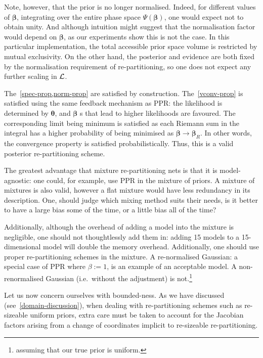 \documentclass[usenatbib]{mnras}
\begin{document}
Note, however, that the prior is no longer normalised. Indeed, for
different values of \(\bm{\beta}\), integrating over the entire phase
space \(\Psi(\bm{\beta})\), one would expect not to obtain unity. And
although intuition might suggest that the normalisation factor
would depend on \(\bm{\beta}\), as our experiments show this is not the
case. In this particular implementation, the total accessible
prior space volume is restricted by mutual exclusivity. On the
other hand, the posterior and evidence are both fixed by the
normalisation requirement of re-partitioning, so one does not
expect any further scaling in \({\cal L}\). 

The~\cref{spec-prop,norm-prop} are satisfied by
construction. The~\cref{vconv-prop} is satisfied using the same
feedback mechanism as PPR: the likelihood is determined by
\(\bm{\theta}\), and \(\bm{\beta}\) s that lead to higher likelihoods are
favoured. The corresponding limit being minimum is satisfied as
each Riemann sum in the integral has a higher probability of being
minimised as \(\bm{\beta}\rightarrow\bm{\beta}_{R}\). In other words, the
convergence property is satisfied probabilistically. Thus, this is
a valid posterior re-partitioning scheme.

The greatest advantage that mixture re-partitioning nets is that
it is model-agnostic: one could, for example, use PPR in the
mixture of priors. A mixture of mixtures is also valid, however a
flat mixture would have less redundancy in its description.  One,
should judge which mixing method suits their needs, is it better
to have a large bias some of the time, or a little bias all of the
time?

Additionally, although the overhead of adding a model into the
mixture is negligible, one should not thoughtlessly add them in:
adding 15 models to a 15-dimensional model will double the memory
overhead. Additionally, one should use proper re-partitioning
schemes in the mixture. A re-normalised Gaussian: a special case
of PPR where \(\beta := 1\), is an example of an acceptable model. A
non-renormalised Gaussian (i.e.~without the adjustment) is
not.\footnote{assuming that our true prior is uniform.}


Let us now concern ourselves with bounded-ness. As we have
discussed (see~\vref{domain-discussion}), when dealing with
re-partitioning schemes such as re-sizeable uniform priors, extra
care must be taken to account for the Jacobian factors arising
from a change of coordinates implicit to re-sizeable
re-partitioning. 
\end{document}

